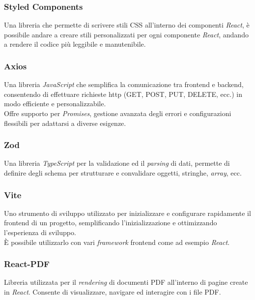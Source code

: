 \subsubsection{Styled Components}

Una libreria che permette di scrivere stili CSS all’interno dei componenti \textit{React}, è possibile andare a creare stili personalizzati per ogni componente \textit{React}, andando a rendere il codice più leggibile e manutenibile.

\subsubsection{Axios}

Una libreria \textit{JavaScript} che semplifica la comunicazione tra frontend e backend, consentendo di effettuare richieste \gls{http} (GET, POST, PUT, DELETE, ecc.) in modo efficiente e personalizzabile. \\
Offre supporto per \textit{Promises}, gestione avanzata degli errori e configurazioni flessibili per adattarsi a diverse esigenze.

\subsubsection{Zod}

Una libreria \textit{TypeScript} per la validazione ed il \textit{parsing} di dati, permette di definire degli schema per strutturare e convalidare oggetti, stringhe, \textit{array}, ecc.

\subsubsection{Vite}

Uno strumento di sviluppo utilizzato per inizializzare e configurare rapidamente il \gls{frontend} di un progetto, semplificando l'inizializzazione e ottimizzando l'esperienza di sviluppo.\\
È possibile utilizzarlo con vari \textit{framework} \gls{frontend} come ad esempio \textit{React}.

\subsubsection{React-PDF}

Libreria utilizzata per il \textit{rendering} di documenti PDF all’interno di pagine create in \textit{React}.
Consente di visualizzare, navigare ed interagire con i file PDF.

